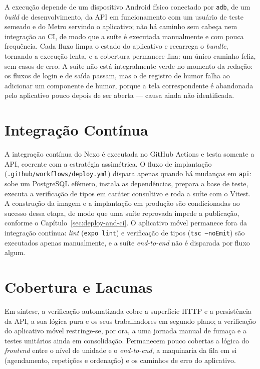 A execução depende de um dispositivo Android físico conectado por \texttt{adb},
de um \textit{build} de desenvolvimento, da API em funcionamento com um usuário
de teste semeado e do Metro servindo o aplicativo; não há caminho sem cabeça
nem integração ao CI, de modo que a suíte é executada manualmente e com pouca
frequência. Cada fluxo limpa o estado do aplicativo e recarrega o
\textit{bundle}, tornando a execução lenta, e a cobertura permanece fina: um
único caminho feliz, sem casos de erro. A suíte não está integralmente verde no
momento da redação: os fluxos de login e de saída passam, mas o de registro de
humor falha ao adicionar um componente de humor, porque a tela correspondente é
abandonada pelo aplicativo pouco depois de ser aberta --- causa ainda não
identificada.

\section{Integração Contínua}\label{sec:test-ci}

A integração contínua do Nexo \cite{Humble_Farley_2011} é executada no GitHub
Actions e testa somente a API, coerente com a estratégia assimétrica. O fluxo
de implantação (\texttt{.github/workflows/deploy.yml}) dispara apenas quando há
mudanças em \texttt{api}: sobe um PostgreSQL efêmero, instala as dependências,
prepara a base de teste, executa a verificação de tipos em caráter consultivo e
roda a suíte com o Vitest. A construção da imagem e a implantação em produção
são condicionadas ao sucesso dessa etapa, de modo que uma suíte reprovada
impede a publicação, conforme o Capítulo~\ref{sec:deploy-and-ci}. O aplicativo
móvel permanece fora da integração contínua: \textit{lint} (\texttt{expo lint})
e verificação de tipos (\texttt{tsc --noEmit}) são executados apenas
manualmente, e a suíte \textit{end-to-end} não é disparada por fluxo algum.

\section{Cobertura e Lacunas}\label{sec:test-gaps}

Em síntese, a verificação automatizada cobre a superfície HTTP e a persistência
da API, a sua lógica pura e os seus trabalhadores em segundo plano; a
verificação do aplicativo móvel restringe-se, por ora, a uma jornada manual de
fumaça e a testes unitários ainda em consolidação. Permanecem pouco cobertas a
lógica do \textit{frontend} entre o nível de unidade e o \textit{end-to-end}, a
maquinaria da fila em si (agendamento, repetições e ordenação) e os caminhos de
erro do aplicativo.

